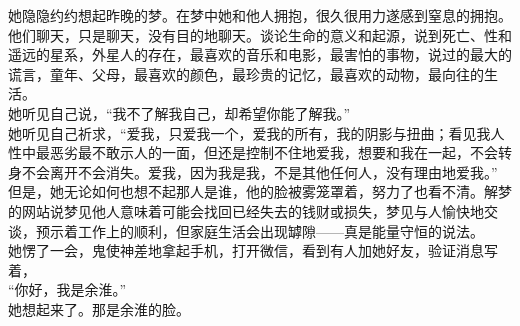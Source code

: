\documentclass[letterpaper, 12pt]{article}
\begin{document}
\begin{multicols}{2}
她隐隐约约想起昨晚的梦。在梦中她和他人拥抱，很久很用力遂感到窒息的拥抱。他们聊天，只是聊天，没有目的地聊天。谈论生命的意义和起源，说到死亡、性和遥远的星系，外星人的存在，最喜欢的音乐和电影，最害怕的事物，说过的最大的谎言，童年、父母，最喜欢的颜色，最珍贵的记忆，最喜欢的动物，最向往的生活。\\

她听见自己说，“我不了解我自己，却希望你能了解我。”\\

她听见自己祈求，“爱我，只爱我一个，爱我的所有，我的阴影与扭曲；看见我人性中最恶劣最不敢示人的一面，但还是控制不住地爱我，想要和我在一起，不会转身不会离开不会消失。爱我，因为我是我，不是其他任何人，没有理由地爱我。”\\

但是，她无论如何也想不起那人是谁，他的脸被雾笼罩着，努力了也看不清。解梦的网站说梦见他人意味着可能会找回已经失去的钱财或损失，梦见与人愉快地交谈，预示着工作上的顺利，但家庭生活会出现罅隙——真是能量守恒的说法。\\

她愣了一会，鬼使神差地拿起手机，打开微信，看到有人加她好友，验证消息写着，\\

“你好，我是余淮。”\\

她想起来了。那是余淮的脸。\\

\end{multicols} 
\end{document}

